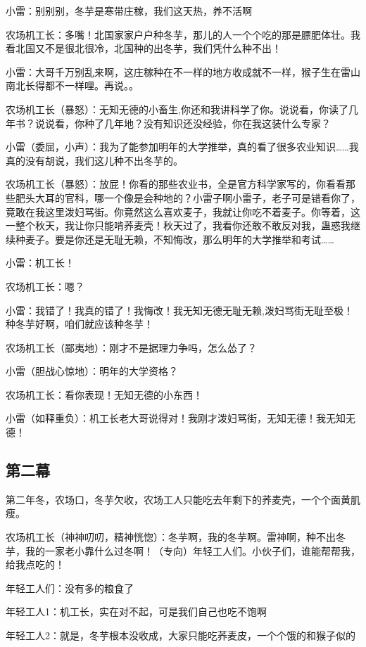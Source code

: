 \documentclass[UTF8,12pt,oneside]{ctexbook}
\begin{document}
    小雷：别别别，冬芋是寒带庄稼，我们这天热，养不活啊
    
    农场机工长：多嘴！北国家家户户种冬芋，那儿的人一个个吃的那是膘肥体壮。我看北国又不是很北很冷，北国种的出冬芋，我们凭什么种不出！
    
    小雷：大哥千万别乱来啊，这庄稼种在不一样的地方收成就不一样，猴子生在雷山南北长得都不一样哩。再说。。
    
    农场机工长（暴怒）：无知无德的小畜生,你还和我讲科学了你。说说看，你读了几年书？说说看，你种了几年地？没有知识还没经验，你在我这装什么专家？
    
    小雷（委屈，小声）：我为了能参加明年的大学推举，真的看了很多农业知识……我真的没有胡说，我们这儿种不出冬芋的。
    
    农场机工长（暴怒）：放屁！你看的那些农业书，全是官方科学家写的，你看看那些肥头大耳的官科，哪一个像是会种地的？小雷子啊小雷子，老子可是错看你了，竟敢在我这里泼妇骂街。你竟然这么喜欢麦子，我就让你吃不着麦子。你等着，这一整个秋天，我让你只能啃荞麦壳！秋天过了，我看你还敢不敢反对我，蛊惑我继续种麦子。要是你还是无耻无赖，不知悔改，那么明年的大学推举和考试……
    
    小雷：机工长！
    
    农场机工长：嗯？
    
    小雷：我错了！我真的错了！我悔改！我无知无德无耻无赖,泼妇骂街无耻至极！种冬芋好啊，咱们就应该种冬芋！
    
    农场机工长（鄙夷地）：刚才不是据理力争吗，怎么怂了？
    
    小雷（胆战心惊地）：明年的大学资格？
    
    农场机工长：看你表现！无知无德的小东西！
    
    小雷（如释重负）：机工长老大哥说得对！我刚才泼妇骂街，无知无德！我无知无德！
    
    \subsection{第二幕}
    \fangsong
    第二年冬，农场口，冬芋欠收，农场工人只能吃去年剩下的荞麦壳，一个个面黄肌瘦。
    
    \songti
    农场机工长（神神叨叨，精神恍惚）：冬芋啊，我的冬芋啊。雷神啊，种不出冬芋，我的一家老小靠什么过冬啊！（专向）年轻工人们。小伙子们，谁能帮帮我，给我点吃的！
    
    年轻工人们：没有多的粮食了
    
    年轻工人1：机工长，实在对不起，可是我们自己也吃不饱啊
    
    年轻工人2：就是，冬芋根本没收成，大家只能吃荞麦皮，一个个饿的和猴子似的
    
\end{document}

